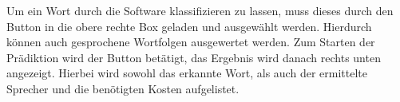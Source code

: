 Um ein Wort durch die Software klassifizieren zu lassen, muss dieses durch den Button  in die obere rechte Box geladen und ausgewählt werden.
Hierdurch können auch gesprochene Wortfolgen ausgewertet werden.
Zum Starten der Prädiktion wird der Button  betätigt, das Ergebnis wird danach rechts unten angezeigt.
Hierbei wird sowohl das erkannte Wort, als auch der ermittelte Sprecher und die benötigten Kosten aufgelistet. 








